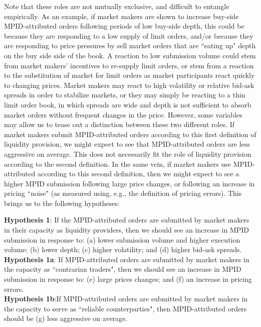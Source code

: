 \documentclass{article}
\begin{document}
Note that these roles are not mutually exclusive, and difficult to entangle empirically. As an example, if market makers are shown to increase buy-side MPID-attributed orders following periods of low buy-side depth, this could be because they are responding to a low supply of limit orders, and/or because they are responding to price pressures by sell market orders that are ``eating up" depth on the buy side side of the book. A reaction to low submission volume could stem from market makers' incentives to re-supply limit orders, or stem from a reaction to the substitution of market for limit orders as market participants react quickly to changing prices. Market makers may react to high volatility or relative bid-ask spreads in order to stabilize markets, or they may simply be reacting to a thin limit order book, in which spreads are wide and depth is not sufficient to absorb market orders without frequent changes in the price. However, some variables may allow us to tease out a distinction between these two different roles. If market makers submit MPID-attributed orders according to this first definition of liquidity provision, we might expect to see that MPID-attributed orders are less aggressive on average. This does not necessarily fit the role of liquidity provision according to the second definition. In the same vein, if market makers use MPID-attributed according to this second definition, then we might expect to see a higher MPID submission following large price changes, or following an increase in pricing ``noise" (as measured using, e.g., the \citet{hasbrouck1993assessing} definition of pricing errors). This brings us to the following hypotheses:


\parbox{\textwidth}{
\noindent \textbf{Hypothesis 1}: If the MPID-attributed orders are submitted by market makers in their capacity as liquidity providers, then we should see an increase in MPID submission in response to: (a) lower submission volume and higher execution volume; (b) lower depth; (c) higher volatility; and (d) higher bid-ask spreads. \\
\noindent \textbf{Hypothesis 1a}: If MPID-attributed orders are submitted by market makers in the capacity as ``contrarian traders", then we should see an increase in MPID submission in response to: (e) large prices changes; and (f) an increase in pricing errors. \\
\noindent \textbf{Hypothesis 1b}:If MPID-attributed orders are submitted by market makers in the capacity to serve as ``reliable counterparties", then MPID-attributed orders should be (g) less aggressive on average.
}
\end{document}
